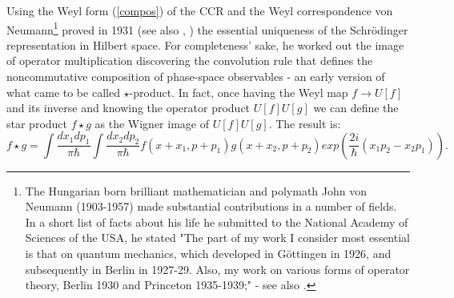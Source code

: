 Using the Weyl form (\ref{compos}) of the CCR and the Weyl correspondence von Neumann\footnote{The Hungarian born brilliant mathematician 
and polymath John von Neumann (1903-1957) made substantial contributions in a number of fields. In a short list of facts about his life he 
submitted to the National Academy of Sciences of the USA, he stated "The part of my work I consider most essential is that on quantum 
mechanics, which developed in G\"ottingen in 1926, and subsequently in Berlin in 1927-29. Also, my work on various forms of operator theory, 
Berlin 1930 and Princeton 1935-1939;" - see also \cite{V58}.} proved in 1931 \cite{vN31} (see also \cite{vN}, \cite{V58}) the essential uniqueness 
of the Schr\"odinger representation in Hilbert space. For completeness' sake, he worked out the image of operator multiplication discovering 
the convolution rule that defines the noncommutative composition of phase-space observables - an early version of what came to be called 
$\star$-product. In fact, once having the Weyl map $f\rightarrow U[f]$ and its inverse and knowing the operator product $U[f]U[g]$ we can 
define the star product $f\star g$ as the Wigner image of $U[f] U[g]$. The result is:
\begin{equation}
\label{star}
f\star g = \int \frac{dx_1 dp_1}{\pi\hbar} \int \frac{dx_2 dp_2}{\pi \hbar} f(x+x_1, p+p_1) g(x+x_2, p+p_2) exp(\frac{2i}{\hbar}(x_1p_2 - x_2 p_1)).
\end{equation}
   
